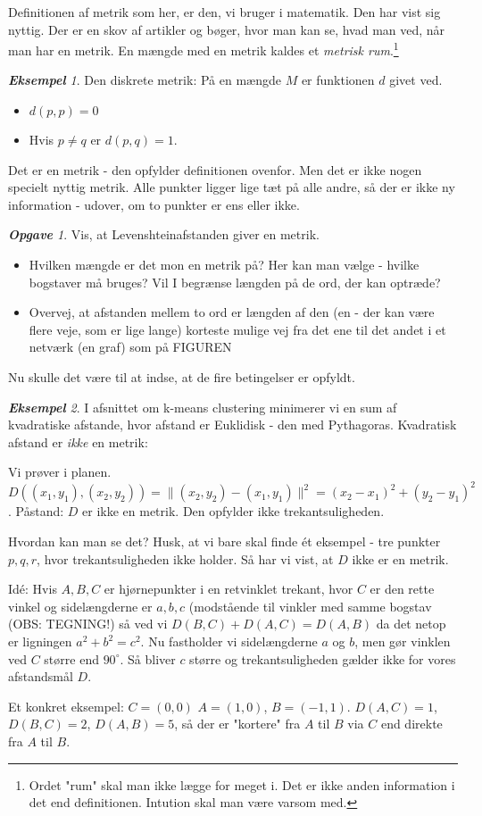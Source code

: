 \documentclass[a4paper, 12pt]{article}
\theoremstyle{remark}
\newtheorem{Eksempel}{\textbf{Eksempel}}
\newtheorem{Opgave}{\textbf{Opgave}}
\begin{document}
Definitionen af metrik som her, er den, vi bruger i matematik. Den har vist sig nyttig. Der er en skov af artikler og bøger, hvor man kan se, hvad man ved, når man har  en metrik. En mængde med en metrik kaldes et \emph{metrisk rum}.\footnote{Ordet "rum"  skal man ikke lægge for meget i. Det er ikke anden information i det end definitionen. Intution skal man være varsom med.}
\begin{Eksempel}
Den diskrete metrik: På en mængde $M$ er funktionen $d$ givet ved. 
\begin{itemize}
\item $d(p,p)=0$
\item Hvis $p\neq q$ er $d(p,q)=1$.
\end{itemize}
Det er en metrik - den opfylder definitionen ovenfor. Men det er ikke nogen specielt nyttig metrik. Alle punkter ligger lige tæt på alle andre, så der er ikke ny information - udover, om  to punkter er ens eller ikke.
\end{Eksempel}
\begin{Opgave}\label{Opg:Levensh} Vis, at Levenshteinafstanden giver en metrik. 
\begin{itemize}
\item Hvilken mængde er det mon en metrik på? Her kan man vælge - hvilke bogstaver må bruges? Vil I begrænse længden på de ord, der kan optræde? 
\item Overvej, at afstanden mellem to ord er længden af den (en - der kan være flere veje, som er lige lange)  korteste mulige vej fra det ene til det andet i et netværk (en graf) som på FIGUREN

\end{itemize}
Nu skulle det være til at indse, at de fire betingelser er opfyldt. 
\end{Opgave}
\begin{Eksempel} I afsnittet om k-means clustering minimerer vi en sum af kvadratiske afstande, hvor afstand er Euklidisk - den med Pythagoras. Kvadratisk afstand er \emph{ikke} en metrik: 

Vi prøver i planen. $D((x_1,y_1),(x_2,y_2))=\|(x_2,y_2)-(x_1,y_1)\|^2=(x_2-x_1)^2+(y_2-y_1)^2$. Påstand: $D$ er ikke en metrik. Den opfylder ikke trekantsuligheden.

Hvordan kan man se det? Husk, at vi bare skal finde ét eksempel - tre punkter $p,q,r$, hvor trekantsuligheden ikke holder. Så har vi vist, at $D$ ikke er en metrik. 

Idé: Hvis $A,B,C$ er hjørnepunkter i en retvinklet trekant, hvor $C$ er den rette vinkel og sidelængderne er $a,b,c$ (modstående til vinkler med samme bogstav (OBS: TEGNING!)
så ved vi $D(B,C)+D(A,C)=D(A,B)$ da det netop er ligningen $a^2+b^2=c^2$. Nu fastholder vi sidelængderne $a$ og $b$, men gør vinklen ved $C$ større end $90^\circ$. Så bliver $c$ større og trekantsuligheden gælder ikke for vores afstandsmål $D$.

Et konkret eksempel: $C=(0,0)$ $A=(1,0)$, $B=(-1,1)$. $D(A,C)=1$, $D(B,C)=2$, $D(A,B)=5$, så der er "kortere" fra $A$ til $B$ via $C$ end direkte fra $A$ til $B$.
\end{Eksempel}
\end{document}

